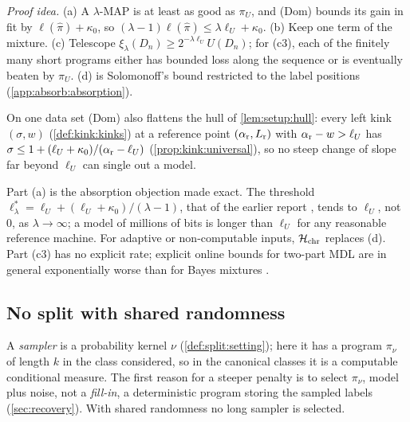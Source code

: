 \emph{Proof idea.} (a) A $\lambda$-MAP is at least as good as $\pi_U$, and (Dom) bounds its gain in fit by $\ell(\hat\pi)+\kappa_0$, so $(\lambda-1)\ell(\hat\pi)\le\lambda\ell_U+\kappa_0$. (b) Keep one term of the mixture. (c) Telescope $\xi_\lambda(D_n)\ge2^{-\lambda\ell_U}U(D_n)$; for (c3), each of the finitely many short programs either has bounded loss along the sequence or is eventually beaten by $\pi_U$. (d) is Solomonoff's bound \citep{solomonoff1978complexity} restricted to the label positions (\cref{app:absorb:absorption}).

On one data set (Dom) also flattens the hull of \cref{lem:setup:hull}: every left kink $(\sigma,w)$ (\cref{def:kink:kinks}) at a reference point $(\alpha_{\rm r},L_{\rm r})$ with $\alpha_{\rm r}-w>\ell_U$ has $\sigma\le1+(\ell_U+\kappa_0)/(\alpha_{\rm r}-\ell_U)$ (\cref{prop:kink:universal}), so no steep change of slope far beyond $\ell_U$ can single out a model.

\begin{remark}[Reading]\label{rem:absorb:reading}
Part (a) is the absorption objection made exact. The threshold $\ell^*_\lambda=\ell_U+(\ell_U+\kappa_0)/(\lambda-1)$, that of the earlier report \citep{claude2026whatfollows}, tends to $\ell_U$, not $0$, as $\lambda\to\infty$; a model of millions of bits is longer than $\ell_U$ for any reasonable reference machine. For adaptive or non-computable inputs, $\mathcal{H}_{\mathrm{chr}}$ replaces (d). Part (c3) has no explicit rate; explicit online bounds for two-part MDL are in general exponentially worse than for Bayes mixtures \citep{poland2005asymptotics}.
\end{remark}

\subsection{No split with shared randomness}\label{sec:split:shared}

A \emph{sampler} is a probability kernel $\nu$ (\cref{def:split:setting}); here it has a program $\pi_\nu$ of length $k$ in the class considered, so in the canonical classes it is a computable conditional measure. The first reason for a steeper penalty is to select $\pi_\nu$, model plus noise, not a \emph{fill-in}, a deterministic program storing the sampled labels (\cref{sec:recovery}). With shared randomness no long sampler is selected.

